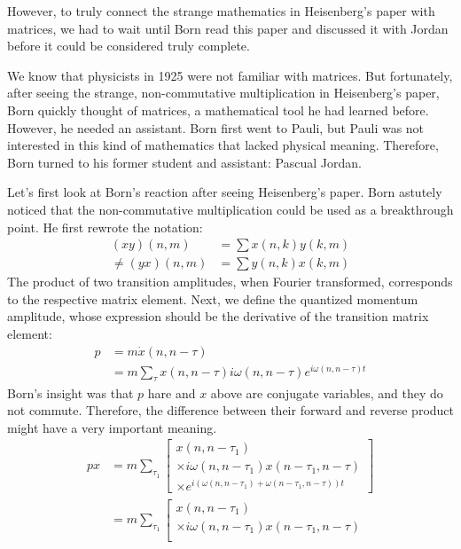 \documentclass[a4paper, 12pt, oneside, onecolumn]{article}
\begin{document}
\begin{multicols}{2}
However, to truly connect the strange mathematics in Heisenberg's paper with matrices, we had to wait until Born read this paper and discussed it with Jordan before it could be considered truly complete.

We know that physicists in 1925 were not familiar with matrices. But fortunately, after seeing the strange, non-commutative multiplication in Heisenberg's paper, Born quickly thought of matrices, a mathematical tool he had learned before. However, he needed an assistant. Born first went to Pauli, but Pauli was not interested in this kind of mathematics that lacked physical meaning. Therefore, Born turned to his former student and assistant: Pascual Jordan.

Let's first look at Born's reaction after seeing Heisenberg's paper. Born astutely noticed that the non-commutative multiplication could be used as a breakthrough point. He first rewrote the notation:
\begin{align}
	\left(xy \right) \left( n, m\right)
	&= \sum x \left( n, k\right) y \left( k, m \right) \nonumber \\
	\neq \left(yx \right) \left( n, m\right)
	&= \sum y \left( n, k\right) x \left( k, m \right)
\end{align}
The product of two transition amplitudes, when Fourier transformed, corresponds to the respective matrix element. Next, we define the quantized momentum amplitude, whose expression should be the derivative of the transition matrix element:
\begin{align}
	p 
	&= m \dot{x}(n,n-\tau) \nonumber \\
	&= m\sum_{\tau} x(n,n-\tau)i\omega(n,n-\tau)e^{i\omega(n,n-\tau)t}
\end{align}
Born's insight was that $p$ hare and $x$ above are conjugate variables, and they do not commute. Therefore, the difference between their forward and reverse product might have a very important meaning.
\begin{align}
	px 
	&= m\sum_{\tau_1} 
	\left[
	\begin{matrix}
	x(n,n-\tau_1) \\
	\times i\omega(n,n-\tau_1)x(n-\tau_1,n-\tau) \\
	\times e^{i(\omega(n,n-\tau_1)+\omega(n-\tau_1,n-\tau))t}
	\end{matrix} 
	\right] \nonumber \\
	&= m\sum_{\tau_1}
	\left[
	\begin{matrix}
	x(n,n-\tau_1) \\
	\times i\omega(n,n-\tau_1)x(n-\tau_1,n-\tau) \\

\end{matrix}
\end{align}
\end{multicols}
\end{document}
